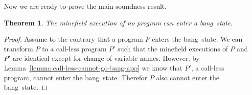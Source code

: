 \documentclass[preprint,9pt]{sigplanconf}
\newcommand{\warning}[1]{{\color{Myred}{#1}}}
\newcommand{\bang}{\mbox{\sc bang}}
\newtheorem{theorem}{Theorem}[section]
\begin{document}
Now we are ready to prove the main soundness result.

\begin{theorem}
The  minefield  execution of  no  program  can enter  a
\bang\ state.
\end{theorem}
 
\begin{proof}
Assume to  the contrary that  a program $P$  enters the
\bang\  state.  We can  transform  $P$  to a  call-less
program $P'$ such that  the minefield executions of $P$
and $P'$  are identical  except for change  of variable
names.  \warning{Check  whether  the previous  line  is
  correct.}                 However,                 by
Lemma~\ref{lemma:call-less-cannot-go-bang-app} we know that
$P'$,   a   call-less   program,   cannot   enter   the
\bang\  state.  Therefor  $P$  also  cannot  enter  the
\bang\ state.
\end{proof}
 
\end{document}
